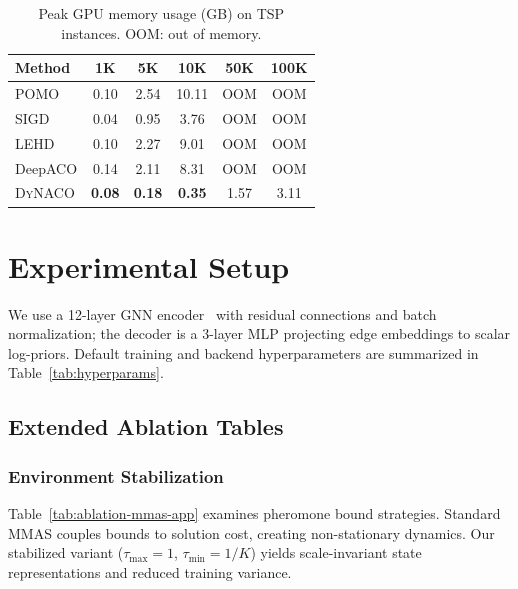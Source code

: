 \documentclass[sigconf]{acmart}
\newcommand{\DyNACO}{\textsc{DyNACO}}
\newcommand{\MMAS}{\textsc{MMAS}}
\begin{document}
\begin{table}[t]
\centering
\caption{Peak GPU memory usage (GB) on TSP instances. OOM: out of memory.}
\label{tab:memory-scaling}
\small
\renewcommand{\arraystretch}{0.85}
\begin{tabular*}{\columnwidth}{@{\extracolsep{\fill}}lccccc@{}}
\toprule
Method & 1K & 5K & 10K & 50K & 100K \\
\midrule
POMO & 0.10 & 2.54 & 10.11 & OOM & OOM \\
SIGD & 0.04 & 0.95 & 3.76 & OOM & OOM \\
LEHD & 0.10 & 2.27 & 9.01 & OOM & OOM \\
DeepACO & 0.14 & 2.11 & 8.31 & OOM & OOM \\
\DyNACO{} & \textbf{0.08} & \textbf{0.18} & \textbf{0.35} & 1.57 & 3.11 \\
\bottomrule
\end{tabular*}
\end{table}

\section{Experimental Setup}
\label{app:setup}

We use a 12-layer GNN encoder~\cite{deepaco} with residual connections and batch normalization; the decoder is a 3-layer MLP projecting edge embeddings to scalar log-priors. Default training and backend hyperparameters are summarized in Table~\ref{tab:hyperparams}.


\subsection{Extended Ablation Tables}
\label{extended_ablation}

\subsubsection{Environment Stabilization}

Table~\ref{tab:ablation-mmas-app} examines pheromone bound strategies.
Standard \MMAS{} couples bounds to solution cost, creating non-stationary dynamics.
Our stabilized variant ($\tau_{\max}{=}1$, $\tau_{\min}{=}1/K$) yields scale-invariant state representations and reduced training variance.
\end{document}
